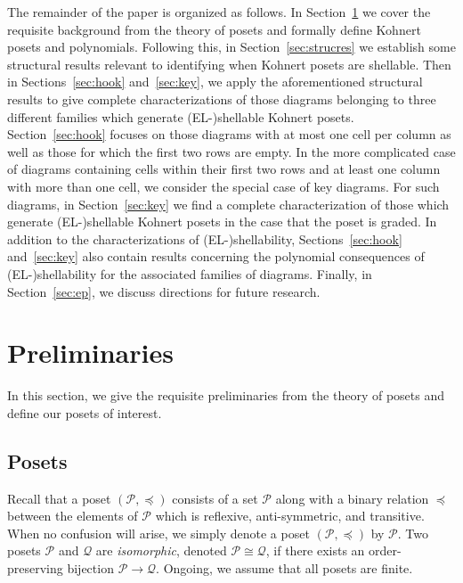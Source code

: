 \documentclass[letterpaper,10pt]{article}
\begin{document}
The remainder of the paper is organized as follows. In Section~\ref{sec:prelim} we cover the requisite background from the theory of posets and formally define Kohnert posets and polynomials. Following this, in Section~\ref{sec:strucres} we establish some structural results relevant to identifying when Kohnert posets are shellable. Then in Sections~\ref{sec:hook} and~\ref{sec:key}, we apply the aforementioned structural results to give complete characterizations of those diagrams belonging to three different families which generate (EL-)shellable Kohnert posets. Section~\ref{sec:hook} focuses on those diagrams with at most one cell per column as well as those for which the first two rows are empty. In the more complicated case of diagrams containing cells within their first two rows and at least one column with more than one cell, we consider the special case of key diagrams. For such diagrams, in Section~\ref{sec:key} we find a complete characterization of those which generate (EL-)shellable Kohnert posets in the case that the poset is graded. In addition to the characterizations of (EL-)shellability, Sections~\ref{sec:hook} and~\ref{sec:key} also contain results concerning the polynomial consequences of (EL-)shellability for the associated families of diagrams. Finally, in Section~\ref{sec:ep}, we discuss directions for future research.

\section{Preliminaries}\label{sec:prelim}

In this section, we give the requisite preliminaries from the theory of posets and define our posets of interest.

\subsection{Posets}

Recall that a poset $(\mathcal{P},\preceq)$ consists of a set $\mathcal{P}$ along with a binary relation $\preceq$ between the elements of $\mathcal{P}$ which is reflexive, anti-symmetric, and transitive. When no confusion will arise, we simply denote a poset $(\mathcal{P}, \preceq)$ by $\mathcal{P}$. Two posets $\mathcal{P}$ and $\mathcal{Q}$ are \textit{isomorphic}, denoted $\mathcal{P}\cong \mathcal{Q}$, if there exists an order-preserving bijection $\mathcal{P}\to\mathcal{Q}$.  Ongoing, we assume that all posets are finite. 
\end{document}
